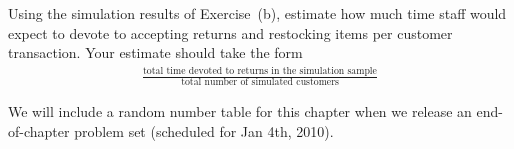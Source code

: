 \begin{exercise}
Using the simulation results of Exercise~(b), estimate how much time staff would expect to devote to accepting returns and restocking items per customer transaction. Your estimate should take the form
\begin{eqnarray*}
\frac{\text{total time devoted to returns in the simulation sample}}
	{\text{total number of simulated customers}}
\end{eqnarray*}
\end{exercise}

\vspace{5cm}

We will include a random number table for this chapter when we release an end-of-chapter problem set (scheduled for Jan 4th, 2010).

